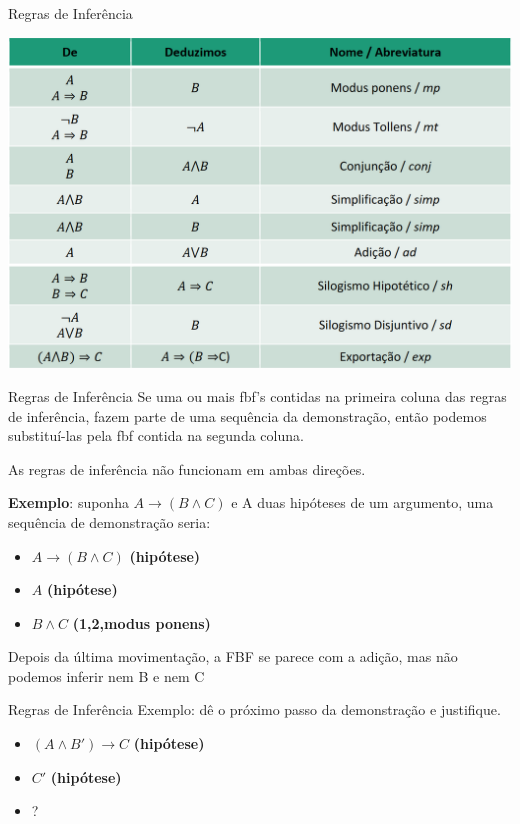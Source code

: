 \documentclass[aspectratio=169]{beamer}
\begin{document}
\begin{frame}{Regras de Inferência}
    \begin{center}
        \includegraphics[width=.7\linewidth]{figs/inferencia.png}
    \end{center}
\end{frame}

\begin{frame}{Regras de Inferência}
    Se uma ou mais fbf's contidas na primeira coluna das regras de inferência,
    fazem parte de uma sequência da demonstração, então podemos substituí-las
    pela fbf contida na segunda coluna.

    \vspace{3mm}
    As regras de inferência não funcionam em ambas direções.

    \textbf{Exemplo}: suponha $A \rightarrow (B \wedge C)$ e A duas hipóteses de um argumento,
    uma sequência de demonstração seria:

    \begin{itemize}
        \item $A \rightarrow (B \wedge C)$ \textbf{(hipótese)}
        \item $A$ \textbf{(hipótese)}
        \item $ B \wedge C$ \textbf{(1,2,modus ponens)}
    \end{itemize}

    Depois da última movimentação, a FBF se parece com a adição, mas não podemos inferir nem B e nem C


\end{frame}

\begin{frame}{Regras de Inferência}
    Exemplo: dê o próximo passo da demonstração e justifique.
    \vspace{4mm}

    \begin{itemize}
        \item $(A \wedge B') \rightarrow C$ \textbf{(hipótese)}
        \item $C'$ \textbf{(hipótese)}
        \item ?
    \end{itemize}
\end{frame}
\end{document}
